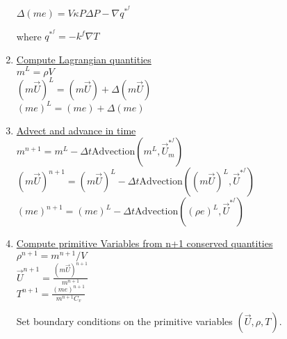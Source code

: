 \documentclass[fleqn]{article}
\newcommand{\U}         {{\vec{U}}}
\newcommand{\delt}      {\ensuremath{\Delta{t}} }
\begin{document}
\begin{enumerate}
 $\Delta(me) =  
    V \kappa P \Delta{P}
    - \nabla q^{*^f}$

where $q^{*^f} = -k^f \nabla T$
%
\item \underline{Compute Lagrangian quantities}\\
    $m^L     = {\rho}V$ \\
    $(m\U)^L = (m\U) + \Delta(m\U)$ \\
    $(m e)^L = (m e) + \Delta(m e)$ \\
%

\item \underline{Advect and advance in time}\\
$ m^{n+1}     = m^L 
                  - \delt\text{Advection}(m^L, \U_ m^{*^{f}})$ \\
$(m \U)^{n+1} = (m \U)^L 
                   - \delt\text{Advection}((m \U)^L, \vec{U}^{*^{f}})$\\
$(me)^{n+1}   = (me)^L       
                   - \delt\text{Advection}((\rho  e)^L, \vec{U}^{*^{f}})$\\ %
\item \underline{Compute primitive Variables from n+1 conserved quantities}\\
$ \rho^{n+1} =  m^{n+1}/V$\\
%
$\U^{n+1} = \frac{(m \U)^{n+1} }{ m^{n+1} }$\\
%
$T^{n+1} = \frac{(me)^{n+1} }{ m^{n+1} C_v }$

Set boundary conditions on the primitive variables $(\U, \rho, T)$.
\end{enumerate}

\onehalfspacing
\end{document}
